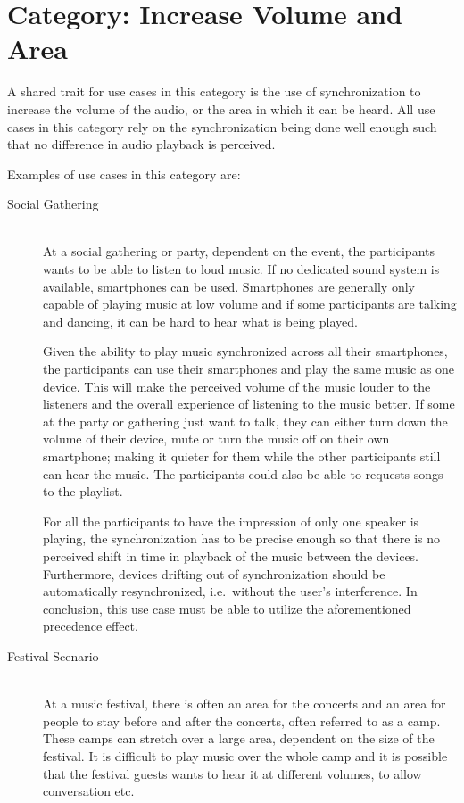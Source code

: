 \section{Category: Increase Volume and Area}\label{sec:category_increase_volume_and_area}
A shared trait for use cases in this category is the use of synchronization to increase the volume of the audio, or the area in which it can be heard.
All use cases in this category rely on the synchronization being done well enough such that no difference in audio playback is perceived.

Examples of use cases in this category are:
\begin{description}
    \item[Social Gathering] \hfill\\
        At a social gathering or party, dependent on the event, the participants wants to be able to listen to loud music.
        If no dedicated sound system is available, smartphones can be used.
        Smartphones are generally only capable of playing music at low volume and if some participants are talking and dancing, it can be hard to hear what is being played.

        Given the ability to play music synchronized across all their smartphones, the participants can use their smartphones and play the same music as one device.
        This will make the perceived volume of the music louder to the listeners and the overall experience of listening to the music better.
        If some at the party or gathering just want to talk, they can either turn down the volume of their device, mute or turn the music off on their own smartphone;
        making it quieter for them while the other participants still can hear the music.
        The participants could also be able to requests songs to the playlist.

        For all the participants to have the impression of only one speaker is playing,
        the synchronization has to be precise enough so that there is no perceived shift in time in playback of the music between the devices.
        Furthermore, devices drifting out of synchronization should be automatically resynchronized, i.e.\ without the user's interference.
        In conclusion, this use case must be able to utilize the aforementioned precedence effect.

    \item[Festival Scenario] \hfill\\
        At a music festival, there is often an area for the concerts and an area for people to stay before and after the concerts, often referred to as a camp.
        These camps can stretch over a large area, dependent on the size of the festival.
        It is difficult to play music over the whole camp and it is possible that the festival guests wants to hear it at different volumes, to allow conversation etc.


\end{description}
